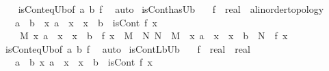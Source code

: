 \begin{isabellebody}
%
\isadelimproof
\ \ %
\endisadelimproof
%
\isatagproof
{}\isamarkupfalse%
\ isCont{\isacharunderscore}{\kern0pt}eq{\isacharunderscore}{\kern0pt}Ub{\isacharbrackleft}{\kern0pt}of\ a\ b\ f{\isacharbrackright}{\kern0pt}\ \isamarkupfalse%
\ auto%
\endisatagproof
{\isafoldproof}%
%
\isadelimproof
\isanewline
%
\endisadelimproof
\isanewline
{}\isamarkupfalse%
\ isCont{\isacharunderscore}{\kern0pt}has{\isacharunderscore}{\kern0pt}Ub{\isacharcolon}{\kern0pt}\isanewline
\ \ \ f\ {\isacharcolon}{\kern0pt}{\isacharcolon}{\kern0pt}\ {\isachardoublequoteopen}real\ {\isasymRightarrow}\ {\isacharprime}{\kern0pt}a{\isacharcolon}{\kern0pt}{\isacharcolon}{\kern0pt}linorder{\isacharunderscore}{\kern0pt}topology{\isachardoublequoteclose}\isanewline
\ \ \ {\isachardoublequoteopen}a\ {\isasymle}\ b\ {\isasymLongrightarrow}\ {\isasymforall}x{\isachardot}{\kern0pt}\ a\ {\isasymle}\ x\ {\isasymand}\ x\ {\isasymle}\ b\ {\isasymlongrightarrow}\ isCont\ f\ x\ {\isasymLongrightarrow}\isanewline
\ \ \ \ {\isasymexists}M{\isachardot}{\kern0pt}\ {\isacharparenleft}{\kern0pt}{\isasymforall}x{\isachardot}{\kern0pt}\ a\ {\isasymle}\ x\ {\isasymand}\ x\ {\isasymle}\ b\ {\isasymlongrightarrow}\ f\ x\ {\isasymle}\ M{\isacharparenright}{\kern0pt}\ {\isasymand}\ {\isacharparenleft}{\kern0pt}{\isasymforall}N{\isachardot}{\kern0pt}\ N\ {\isacharless}{\kern0pt}\ M\ {\isasymlongrightarrow}\ {\isacharparenleft}{\kern0pt}{\isasymexists}x{\isachardot}{\kern0pt}\ a\ {\isasymle}\ x\ {\isasymand}\ x\ {\isasymle}\ b\ {\isasymand}\ N\ {\isacharless}{\kern0pt}\ f\ x{\isacharparenright}{\kern0pt}{\isacharparenright}{\kern0pt}{\isachardoublequoteclose}\isanewline
%
\isadelimproof
\ \ %
\endisadelimproof
%
\isatagproof
{}\isamarkupfalse%
\ isCont{\isacharunderscore}{\kern0pt}eq{\isacharunderscore}{\kern0pt}Ub{\isacharbrackleft}{\kern0pt}of\ a\ b\ f{\isacharbrackright}{\kern0pt}\ \isamarkupfalse%
\ auto%
\endisatagproof
{\isafoldproof}%
%
\isadelimproof
\isanewline
%
\endisadelimproof
\isanewline
{}\isamarkupfalse%
\ isCont{\isacharunderscore}{\kern0pt}Lb{\isacharunderscore}{\kern0pt}Ub{\isacharcolon}{\kern0pt}\isanewline
\ \ \ f\ {\isacharcolon}{\kern0pt}{\isacharcolon}{\kern0pt}\ {\isachardoublequoteopen}real\ {\isasymRightarrow}\ real{\isachardoublequoteclose}\isanewline
\ \ \ {\isachardoublequoteopen}a\ {\isasymle}\ b{\isachardoublequoteclose}\ {\isachardoublequoteopen}{\isasymforall}x{\isachardot}{\kern0pt}\ a\ {\isasymle}\ x\ {\isasymand}\ x\ {\isasymle}\ b\ {\isasymlongrightarrow}\ isCont\ f\ x{\isachardoublequoteclose}\isanewline

\end{isabellebody}
